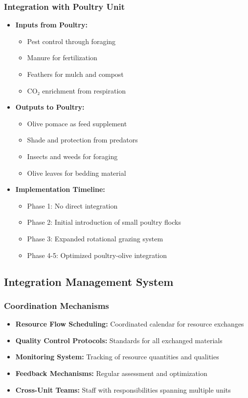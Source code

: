 \subsubsection{Integration with Poultry Unit}
\begin{itemize}
    \item \textbf{Inputs from Poultry:}
    \begin{itemize}
        \item Pest control through foraging
        \item Manure for fertilization
        \item Feathers for mulch and compost
        \item CO₂ enrichment from respiration
    \end{itemize}
    
    \item \textbf{Outputs to Poultry:}
    \begin{itemize}
        \item Olive pomace as feed supplement
        \item Shade and protection from predators
        \item Insects and weeds for foraging
        \item Olive leaves for bedding material
    \end{itemize}
    
    \item \textbf{Implementation Timeline:}
    \begin{itemize}
        \item Phase 1: No direct integration
        \item Phase 2: Initial introduction of small poultry flocks
        \item Phase 3: Expanded rotational grazing system
        \item Phase 4-5: Optimized poultry-olive integration
    \end{itemize}
\end{itemize}

\subsection{Integration Management System}

\subsubsection{Coordination Mechanisms}
\begin{itemize}
    \item \textbf{Resource Flow Scheduling:} Coordinated calendar for resource exchanges
    \item \textbf{Quality Control Protocols:} Standards for all exchanged materials
    \item \textbf{Monitoring System:} Tracking of resource quantities and qualities
    \item \textbf{Feedback Mechanisms:} Regular assessment and optimization
    \item \textbf{Cross-Unit Teams:} Staff with responsibilities spanning multiple units
\end{itemize}

